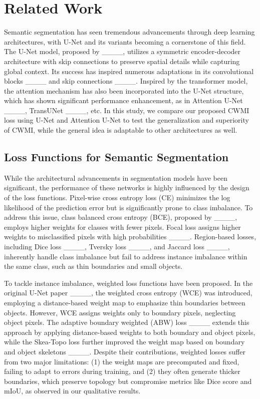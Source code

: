 \section{Related Work}
Semantic segmentation has seen tremendous advancements through deep learning architectures, with U-Net and its variants becoming a cornerstone of this field. The U-Net model, proposed by ____, utilizes a symmetric encoder-decoder architecture with skip connections to preserve spatial details while capturing global context. Its success has inspired numerous adaptations in its convolutional blocks ____ and skip connections ____. Inspired by the transformer model, the attention mechanism has also been incorporated into the U-Net structure, which has shown significant performance enhancement, as in Attention U-Net ____, TransUNet ____, etc. In this study, we compare our proposed CWMI loss using U-Net and Attention U-Net to test the generalization and superiority of CWMI, while the general idea is adaptable to other architectures as well. 

\subsection{Loss Functions for Semantic Segmentation}
While the architectural advancements in segmentation models have been significant, the performance of these networks is highly influenced by the design of the loss functions. Pixel-wise cross entropy loss (CE) minimizes the log likelihood of the prediction error but is significantly prone to class imbalance. To address this issue, class balanced cross entropy (BCE), proposed by ____, employs higher weights for classes with fewer pixels. Focal loss assigns higher weights to misclassified pixels with high probabilities ____. Region-based losses, including Dice loss ____, Tversky loss ____, and Jaccard loss ____, inherently handle class imbalance but fail to address instance imbalance within the same class, such as thin boundaries and small objects.

To tackle instance imbalance, weighted loss functions have been proposed. In the original U-Net paper ____, the weighted cross entropy (WCE) was introduced, employing a distance-based weight map to emphasize thin boundaries between objects. However, WCE assigns weights only to boundary pixels, neglecting object pixels. The adaptive boundary weighted (ABW) loss ____ extends this approach by applying distance-based weights to both boundary and object pixels, while the Skea-Topo loss further improved the weight map based on boundary and object skeletons ____. Despite their contributions, weighted losses suffer from two major limitations: (1) the weight maps are precomputed and fixed, failing to adapt to errors during training, and (2) they often generate thicker boundaries, which preserve topology but compromise metrics like Dice score and mIoU, as observed in our qualitative results.

